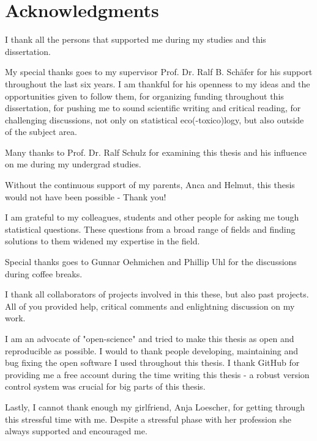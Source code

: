 
\begingroup
\let\clearpage\relax
\let\cleardoublepage\relax
\let\cleardoublepage\relax

\chapter*{Acknowledgments}

I thank all the persons that supported me during my studies and this dissertation.

My special thanks goes to my supervisor Prof. Dr. Ralf B. Schäfer for his support throughout the last six years. 
I am thankful for his openness to my ideas and the opportunities given to follow them, 
for organizing funding throughout this dissertation, 
for pushing me to sound scientific writing and critical reading, 
for challenging discussions, not only on statistical eco(-toxico)logy, but also outside of the subject area.

Many thanks to Prof. Dr. Ralf Schulz for examining this thesis and his influence on me during my undergrad studies.

Without the continuous support of my parents, Anca and Helmut, this thesis would not have been possible - Thank you!

I am grateful to my colleagues, students and other people for asking me tough statistical questions. 
These questions from a broad range of fields and finding solutions to them widened my expertise in the field.

Special thanks goes to Gunnar Oehmichen and Phillip Uhl for the discussions during coffee breaks.

I thank all collaborators of projects involved in this these, but also past projects. All of you provided help, critical comments and enlightning discussion on my work.

I am an advocate of "open-science" and tried to make this thesis as open and reproducible as possible. I would to thank people developing, maintaining and bug fixing the open software I used throughout this thesis. I thank GitHub for providing me a free account during the time writing this thesis - a robust version control system was crucial for big parts of this thesis. 

Lastly, I cannot thank enough my girlfriend, Anja Loescher, for getting through this stressful time with me.
Despite a stressful phase with her profession she always supported and encouraged me. 


\endgroup 
